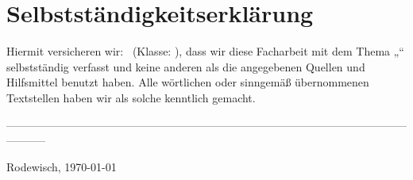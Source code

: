 \section*{Selbstständigkeitserklärung}

\vspace{20mm}

Hiermit versicheren wir: \theauthor\ (Klasse: \klasse), 
dass wir diese Facharbeit mit dem Thema „\thetitle“ selbstständig 
verfasst und keine anderen als die angegebenen Quellen und Hilfsmittel 
benutzt haben. Alle wörtlichen oder sinngemäß übernommenen Textstellen 
haben wir als solche kenntlich gemacht.

\vspace{70mm}

-----------------------------------------------------------------------------------------------------------------------
\begin{flushright}
Rodewisch, \today
\end{flushright}